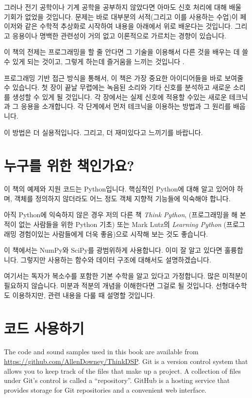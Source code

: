 \documentclass[12pt]{book} \usepackage[width=5.5in,height=8.5in, hmarginratio=3:2,vmarginratio=1:1]{geometry}
\begin{document}
그러나 전기 공학이나 기계 공학을 공부하지 않았다면 아마도 신호 처리에 대해 배울 기회가 없었을 것입니다. 문제는 바로 대부분의 서적(그리고 이를 사용하는 수업)이 페이저와 같은 수학적 추상화로 시작하여 내용을 아래에서 위로 배운다는 것입니다. 그리고 응용이나 명백한 관련성이 거의 없고 이론적으로 가르치는 경향이 있습니다. 

이 책의 전제는 프로그래밍을 할 줄 안다면 그 기술을 이용해서 다른 것을 배우는 데 쓸 수 있게 되는 것이고, 그렇게 하는데 즐거움을 느끼는 것입니다 . 

프로그래밍 기반 접근 방식을 통해서, 이 책은 가장 중요한 아이디어들을 바로 보여줄 수 있습니다. 첫 장이 끝날 무렵에는 녹음된 소리와 기타 신호를 분석하고 새로운 소리를 생성할 수 있게 될 것입니다. 각 장에서는 실제 신호에 적용할 수있는 새로운 테크닉과 그 응용을 소개합니다. 각 단계에서 먼저 테크닉을 이용하는 방법과 그 원리를 배웁니다. 

이 방법은 더 실용적입니다. 그리고, 더 재미있다고 느끼기를 바랍니다. 

\section{누구를 위한 책인가요?} 

이 책의 예제와 지원 코드는 Python입니다. 핵심적인 Python에 대해 알고 있어야 하며, 객체를 정의하지 않더라도 어느 정도 객체 지향적 기능들에 익숙해야 합니다. 

아직 Python에 익숙하지 않은 경우 저의 다른 책 {\it Think Python}, (프로그래밍을 해 본 적이 없는 사람들을 위한 Python 기초)  또는 Mark Lutz의 {\it Learning Python} (프로그래밍 경험이있는 사람들에게 더욱 좋음)으로 시작해 보는 것도 좋습니다. 

이 책에서는 NumPy와 SciPy를 광범위하게 사용합니다. 이미 잘 알고 있다면 훌륭합니다. 그렇지만 사용하는 함수와 데이터 구조에 대해서도 설명하겠습니다. 

여기서는 독자가 복소수를 포함한 기본 수학을 알고 있다고 가정합니다. 많은 미적분이 필요하지 않습니다. 미분과 적분의 개념을 이해한다면 그걸로 될 것입니다. 선형대수학도 이용하지만, 관련 내용을 다룰 때 설명할 것입니다. 

\section{코드 사용하기} \label{code} 

The code and sound samples used in this book are available from \url{https://github.com/AllenDowney/ThinkDSP}. Git is a version control system that allows you to keep track of the files that make up a project. A collection of files under Git's control is called a ``repository''. GitHub is a hosting service that provides storage for Git repositories and a convenient web interface.    
\end{document}
